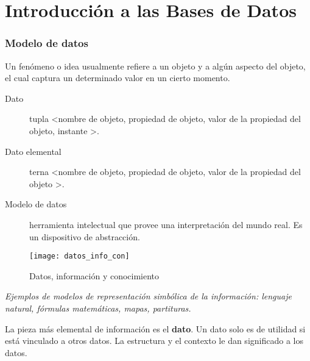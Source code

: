\documentclass[a4paper, twoside]{article}
\newcommand{\rutapaquetes}{./paquetes-apunte}
\begin{document}
\maketitle

\tableofcontents


\part{Introducción a las Bases de Datos}

\section{Modelo de datos}
Un fenómeno o idea usualmente refiere a un objeto y a algún aspecto del objeto, el cual captura un determinado valor en un cierto momento.

\begin{description}
	\item [Dato] tupla \textless nombre de objeto, propiedad de objeto, valor de la propiedad del objeto, instante \textgreater .
	\item [Dato elemental] terna \textless nombre de objeto, propiedad de objeto, valor de la propiedad del objeto \textgreater .
	\item [Modelo de datos] herramienta intelectual que provee una interpretación del mundo real. Es un dispositivo de abstracción.
\end{description}

\begin{figure}[H]
	\noindent
	\centering
	\texttt{[image: datos\_info\_con]}
	\caption{Datos, información y conocimiento}
\end{figure}

\emph{Ejemplos de modelos de representación simbólica de la información: lenguaje natural, fórmulas matemáticas, mapas, partituras.}

La pieza más elemental de información es el \textbf{dato}. Un dato solo es de utilidad si está vinculado a otros datos. La estructura y el contexto le dan significado a los datos.
\end{document}
